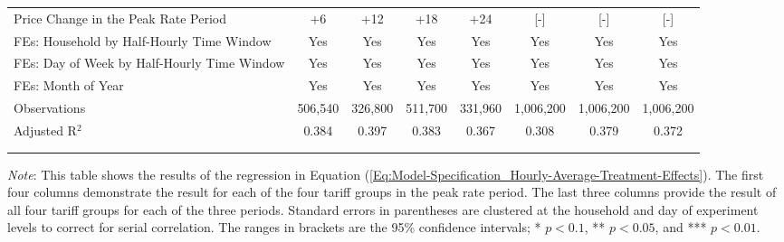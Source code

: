 \begin{table}[t!]
\begin{adjustbox}{scale = 0.75}
\begin{threeparttable}
\begin{tabular}{@{\extracolsep{3pt}}lccccccc}
                    Price Change in the Peak Rate Period & +6 & +12 & +18 & +24 & [-] & [-] & [-] \\
                    FEs: Household by Half-Hourly Time Window & Yes & Yes & Yes & Yes & Yes & Yes & Yes \\
                    FEs: Day of Week by Half-Hourly Time Window & Yes & Yes & Yes & Yes & Yes & Yes & Yes \\
                    FEs: Month of Year & Yes & Yes & Yes & Yes & Yes & Yes & Yes \\
                    Observations & 506,540 & 326,800 & 511,700 & 331,960 & 1,006,200 & 1,006,200 & 1,006,200 \\
                    Adjusted R$^{2}$ & 0.384 & 0.397 & 0.383 & 0.367 & 0.308 & 0.379 & 0.372 \\
                    \\[-2.0ex]
                    \hline \hline
                    \\[-4.5ex]
                \end{tabular}
                \begin{tablenotes}[flushleft]
                    \footnotesize
                    \item \textit{Note}: This table shows the results of the regression in Equation (\ref{Eq:Model-Specification_Hourly-Average-Treatment-Effects}). The first four columns demonstrate the result for each of the four tariff groups in the peak rate period. The last three columns provide the result of all four tariff groups for each of the three periods. Standard errors in parentheses are clustered at the household and day of experiment levels to correct for serial correlation. The ranges in brackets are the 95\% confidence intervals; * $p < 0.1$, ** $p < 0.05$, and *** $p < 0.01$.
                \end{tablenotes}
            \end{threeparttable}
        \end{adjustbox}
    \end{table}
